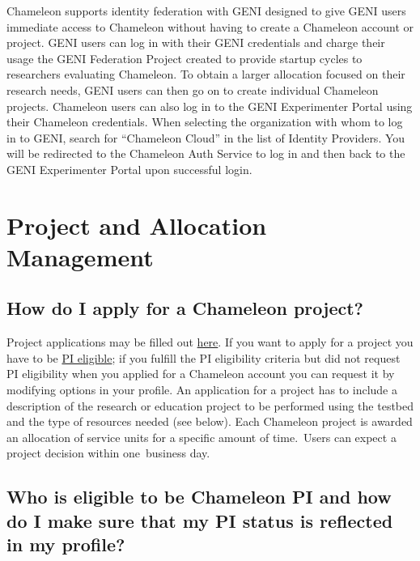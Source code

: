 Chameleon supports identity federation with GENI designed to give GENI
users immediate access to Chameleon without having to create a Chameleon
account or project. GENI users can log in with their GENI credentials
and charge their usage the GENI Federation Project created to provide
startup cycles to researchers evaluating Chameleon. To obtain a larger
allocation focused on their research needs, GENI users can then go on to
create individual Chameleon projects. Chameleon users can also log in to
the GENI Experimenter Portal using their Chameleon credentials. When
selecting the organization with whom to log in to GENI, search for
``Chameleon Cloud'' in the list of Identity Providers. You will be
redirected to the Chameleon Auth Service to log in and then back to the
GENI Experimenter Portal upon successful login.

\section{Project and Allocation
Management}\label{project-and-allocation-management}

\subsection{How do I apply for a Chameleon
project?}\label{how-do-i-apply-for-a-chameleon-project}

Project applications may be filled out
\href{https://www.chameleoncloud.org/user/projects/new/}{here}. If you
want to apply for a project you have to be
\href{https://www.chameleoncloud.org/docs/getting-started/pi-eligibility/}{PI
eligible}; if you fulfill the PI eligibility criteria but did not
request PI eligibility when you applied for a Chameleon account you can
request it by modifying options in your profile. An application for a
project has to include a description of the research or education
project to be performed using the testbed and the type of resources
needed (see below). Each Chameleon project is awarded an allocation of
service units for a specific amount of time.~Users can expect a project
decision within one~business day.

\subsection{Who is eligible to be Chameleon PI and how do I make sure
that my PI status is reflected in my
profile?}\label{who-is-eligible-to-be-chameleon-pi-and-how-do-i-make-sure-that-my-pi-status-is-reflected-in-my-profile}

